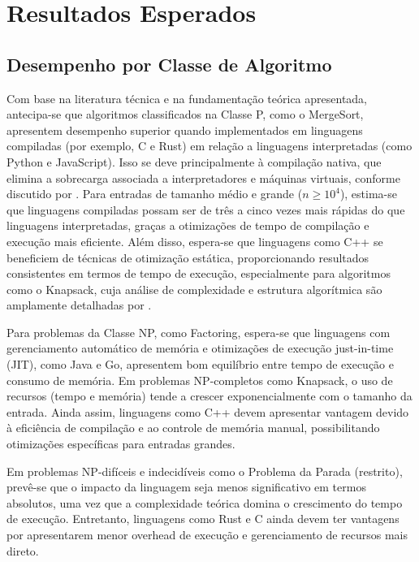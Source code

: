 \documentclass[12pt, a4paper]{article}
\begin{document}
\section{Resultados Esperados}

\subsection{Desempenho por Classe de Algoritmo}

Com base na literatura técnica  e na fundamentação teórica apresentada, antecipa-se que algoritmos classificados na Classe P, como o MergeSort, apresentem desempenho superior quando implementados em linguagens compiladas (por exemplo, C e Rust) em relação a linguagens interpretadas (como Python e JavaScript). Isso se deve principalmente à compilação nativa, que elimina a sobrecarga associada a interpretadores e máquinas virtuais, conforme discutido por . Para entradas de tamanho médio e grande (\( n \geq 10^4 \)), estima-se que linguagens compiladas possam ser de três a cinco vezes mais rápidas do que linguagens interpretadas, graças a otimizações de tempo de compilação e execução mais eficiente. Além disso, espera-se que linguagens como C++ se beneficiem de técnicas de otimização estática, proporcionando resultados consistentes em termos de tempo de execução, especialmente para algoritmos como o Knapsack, cuja análise de complexidade e estrutura algorítmica são amplamente detalhadas por .

Para problemas da Classe NP, como Factoring, espera-se que linguagens com gerenciamento automático de memória e otimizações de execução just-in-time (JIT), como Java e Go, apresentem bom equilíbrio entre tempo de execução e consumo de memória. Em problemas NP-completos como Knapsack, o uso de recursos (tempo e memória) tende a crescer exponencialmente com o tamanho da entrada. Ainda assim, linguagens como C++ devem apresentar vantagem devido à eficiência de compilação e ao controle de memória manual, possibilitando otimizações específicas para entradas grandes.

Em problemas NP-difíceis e indecidíveis como o Problema da Parada (restrito), prevê-se que o impacto da linguagem seja menos significativo em termos absolutos, uma vez que a complexidade teórica domina o crescimento do tempo de execução. Entretanto, linguagens como Rust e C ainda devem ter vantagens por apresentarem menor overhead de execução e gerenciamento de recursos mais direto.
\end{document}
